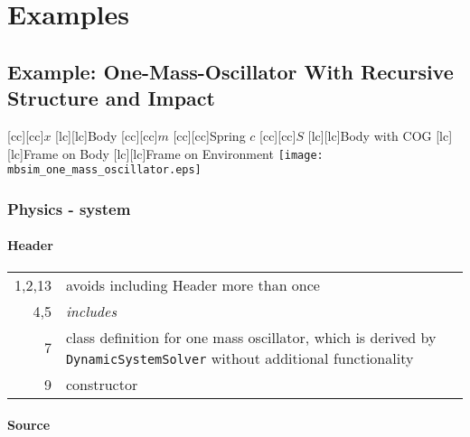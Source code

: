 \section{Examples}

\subsection{Example: One-Mass-Oscillator With Recursive Structure and Impact}

\hspace*{0.2\hsize}
   [cc][cc]{$x$}
   [lc][lc]{Body}
   [cc][cc]{$m$}
   [cc][cc]{Spring $c$}
   [cc][cc]{$S$}
   [lc][lc]{Body with COG}
  [lc][lc]{Frame on Body}
  [lc][lc]{Frame on Environment}
  \texttt{[image: mbsim\_one\_mass\_oscillator.eps]}

\subsubsection{Physics - system}

\paragraph{Header}


\begin{tabular}{r|p{0.85\hsize}}
  1,2,13 & avoids including Header more than once\\
  4,5  & \emph{includes}\\
  7 & class definition for one mass oscillator, which is derived by \texttt{DynamicSystemSolver} without additional functionality\\
  9 & constructor
\end{tabular}

\paragraph{Source}


